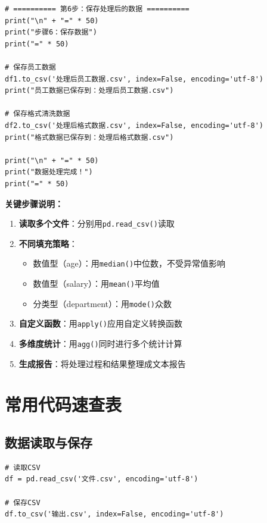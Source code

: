 \documentclass[12pt,a4paper]{article}
\begin{document}
\begin{practicebox}
\begin{lstlisting}[caption={员工信息数据处理完整解答}]
# ========== 第6步：保存处理后的数据 ==========
print("\n" + "=" * 50)
print("步骤6：保存数据")
print("=" * 50)

# 保存员工数据
df1.to_csv('处理后员工数据.csv', index=False, encoding='utf-8')
print("员工数据已保存到：处理后员工数据.csv")

# 保存格式清洗数据
df2.to_csv('处理后格式数据.csv', index=False, encoding='utf-8')
print("格式数据已保存到：处理后格式数据.csv")

print("\n" + "=" * 50)
print("数据处理完成！")
print("=" * 50)
\end{lstlisting}

\textbf{关键步骤说明：}

\begin{enumerate}
    \item \textbf{读取多个文件}：分别用\texttt{pd.read\_csv()}读取
    \item \textbf{不同填充策略}：
    \begin{itemize}
        \item 数值型（age）：用\texttt{median()}中位数，不受异常值影响
        \item 数值型（salary）：用\texttt{mean()}平均值
        \item 分类型（department）：用\texttt{mode()}众数
    \end{itemize}
    \item \textbf{自定义函数}：用\texttt{apply()}应用自定义转换函数
    \item \textbf{多维度统计}：用\texttt{agg()}同时进行多个统计计算
    \item \textbf{生成报告}：将处理过程和结果整理成文本报告
\end{enumerate}
\end{practicebox}

\section{常用代码速查表}

\subsection{数据读取与保存}

\begin{lstlisting}[caption={读写数据}]
# 读取CSV
df = pd.read_csv('文件.csv', encoding='utf-8')

# 保存CSV
df.to_csv('输出.csv', index=False, encoding='utf-8')
\end{lstlisting}
\end{document}
